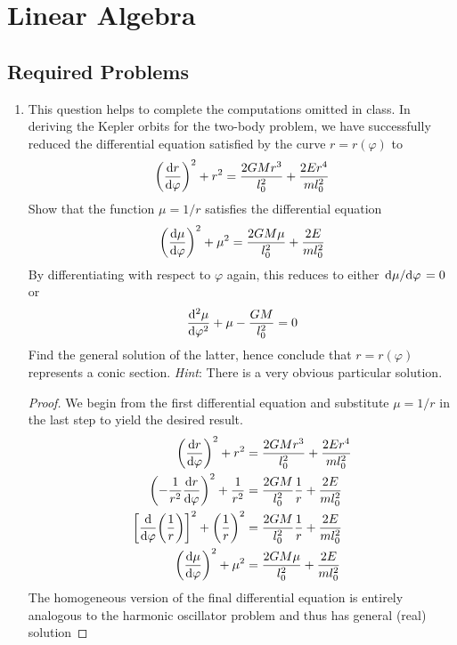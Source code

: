 \documentclass[../psets.tex]{subfiles}
\begin{document}
\section{Linear Algebra}
\subsection*{Required Problems}
\begin{enumerate}
    \item {}This question helps to complete the computations omitted in class. In deriving the Kepler orbits for the two-body problem, we have successfully reduced the differential equation satisfied by the curve $r=r(\varphi)$ to
    \begin{equation*}
        \left( \dv{r}{\varphi} \right)^2+r^2 = \frac{2GMr^3}{l_0^2}+\frac{2Er^4}{ml_0^2}
    \end{equation*}
    Show that the function $\mu=1/r$ satisfies the differential equation
    \begin{equation*}
        \left( \dv{\mu}{\varphi} \right)^2+\mu^2 = \frac{2GM\mu}{l_0^2}+\frac{2E}{ml_0^2}
    \end{equation*}
    By differentiating with respect to $\varphi$ again, this reduces to either $\dv*{\mu}{\varphi}=0$ or
    \begin{equation*}
        \dv[2]{\mu}{\varphi}+\mu-\frac{GM}{l_0^2} = 0
    \end{equation*}
    Find the general solution of the latter, hence conclude that $r=r(\varphi)$ represents a conic section. \emph{Hint}: There is a very obvious particular solution.
    \begin{proof}
        We begin from the first differential equation and substitute $\mu=1/r$ in the last step to yield the desired result.
        \begin{align*}
            \left( \dv{r}{\varphi} \right)^2+r^2 &= \frac{2GMr^3}{l_0^2}+\frac{2Er^4}{ml_0^2}\\
            \left( -\frac{1}{r^2}\dv{r}{\varphi} \right)^2+\frac{1}{r^2} &= \frac{2GM}{l_0^2}\frac{1}{r}+\frac{2E}{ml_0^2}\\
            \left[ \dv{\varphi}(\frac{1}{r}) \right]^2+\left( \frac{1}{r} \right)^2 &= \frac{2GM}{l_0^2}\frac{1}{r}+\frac{2E}{ml_0^2}\\
            \left( \dv{\mu}{\varphi} \right)^2+\mu^2 &= \frac{2GM\mu}{l_0^2}+\frac{2E}{ml_0^2}
        \end{align*}
        The homogeneous version of the final differential equation is entirely analogous to the harmonic oscillator problem and thus has general (real) solution

\end{proof}
\end{enumerate}
\end{document}

